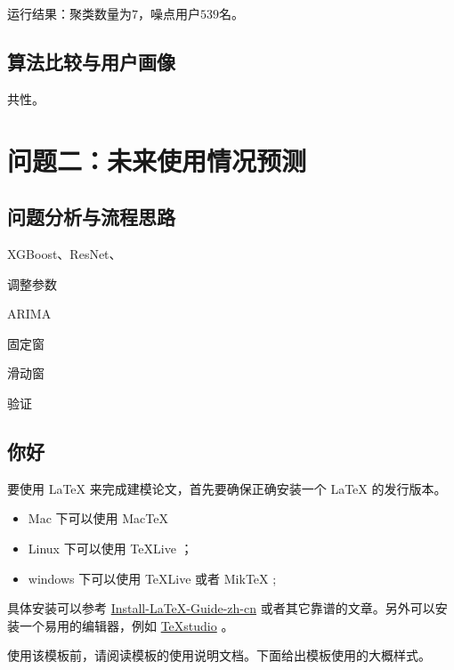 \documentclass[withoutpreface,bwprint]{cumcmthesis}
\begin{document}
运行结果：聚类数量为$7$，噪点用户$539$名。

\subsection{算法比较与用户画像}

共性。

\newpage
\section{问题二：未来使用情况预测}

\subsection{问题分析与流程思路}

XGBoost、ResNet、

调整参数

ARIMA

固定窗

滑动窗

验证

\newpage
\subsection{你好}
要使用 \LaTeX{} 来完成建模论文，首先要确保正确安装一个 \LaTeX{} 的发行版本。

\begin{itemize}
    \item Mac 下可以使用 Mac\TeX{}
    \item Linux 下可以使用 \TeX{}Live ；
    \item windows 下可以使用 \TeX{}Live 或者 Mik\TeX{} ;
\end{itemize}

具体安装可以参考 \href{https://github.com/OsbertWang/install-latex-guide-zh-cn/releases/}{Install-LaTeX-Guide-zh-cn} 或者其它靠谱的文章。另外可以安装一个易用的编辑器，例如 \href{https://mirrors.tuna.tsinghua.edu.cn/github-release/texstudio-org/texstudio/LatestRelease/}{\TeX{}studio} 。

使用该模板前，请阅读模板的使用说明文档。下面给出模板使用的大概样式。
\end{document}
